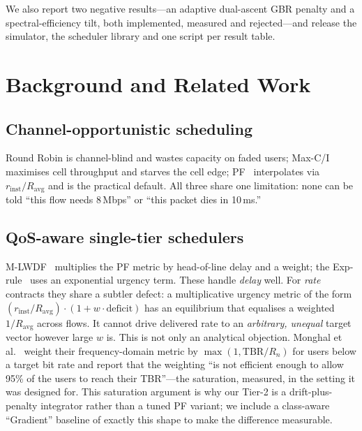 \documentclass[conference]{IEEEtran}
\begin{document}
We also report two negative results---an adaptive dual-ascent GBR penalty and
a spectral-efficiency tilt, both implemented, measured and rejected---and
release the simulator, the scheduler library and one script per result table.

\section{Background and Related Work}

\subsection{Channel-opportunistic scheduling}
Round Robin is channel-blind and wastes capacity on faded users; Max-C/I
maximises cell throughput and starves the cell edge; PF~\cite{jalali2000}
interpolates via $r_{\mathrm{inst}}/R_{\mathrm{avg}}$ and is the practical
default. All three share one limitation: none can be told ``this flow needs
8\,Mbps'' or ``this packet dies in 10\,ms.''

\subsection{QoS-aware single-tier schedulers}
M-LWDF~\cite{andrews2001} multiplies the PF metric by head-of-line delay
and a weight; the Exp-rule~\cite{shakkottai2002} uses an exponential
urgency term. These handle \emph{delay} well. For \emph{rate} contracts
they share a subtler defect: a multiplicative urgency metric of the form
$(r_{\mathrm{inst}}/R_{\mathrm{avg}})\cdot(1+w\cdot\mathrm{deficit})$ has
an equilibrium that equalises a weighted $1/R_{\mathrm{avg}}$ across flows.
It cannot drive delivered rate to an \emph{arbitrary, unequal} target
vector however large $w$ is. This is not only an analytical objection.
Monghal et al.~\cite{monghal2008qos} weight their frequency-domain metric
by $\max(1, \mathrm{TBR}/R_n)$ for users below a target bit rate and
report that the weighting ``is not efficient enough to allow 95\% of the
users to reach their TBR''---the saturation, measured, in the setting it
was designed for. This saturation argument is why our Tier-2 is
a drift-plus-penalty integrator rather than a tuned PF variant; we include
a class-aware ``Gradient'' baseline of exactly this shape to make the
difference measurable.
\end{document}

